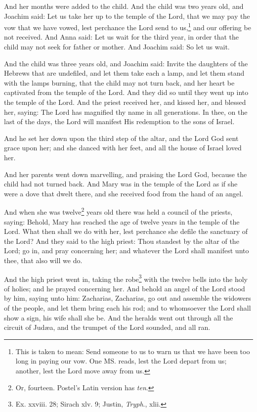 \pend\pstart
{}

\pend\setcounter{pstartR}{1}\pstart
And her months were added to the child. And the child was two years old, and Joachim said: Let us take her up to the temple of the Lord, that we may pay the vow that we have vowed, lest perchance the Lord send to us,\footnote{This is taken to mean: Send someone to us to warn us that we have been too long in paying our vow. One MS. reads, lest the Lord depart from us; another, lest the Lord move away from us.} and our offering be not received. And Anna said: Let us wait for the third year, in order that the child may not seek for father or mother. And Joachim said: So let us wait.

\pend\pstart
And the child was three years old, and Joachim said: Invite the daughters of the Hebrews that are undefiled, and let them take each a lamp, and let them stand with the lamps burning, that the child may not turn back, and her heart be captivated from the temple of the Lord. And they did so until they went up into the temple of the Lord. And the priest received her, and kissed her, and blessed her, saying: The Lord has magnified thy name in all generations. In thee, on the last of the days, the Lord will manifest His redemption to the sons of Israel.

\pend\pstart
And he set her down upon the third step of the altar, and the Lord God sent grace upon her; and she danced with her feet, and all the house of Israel loved her.

\pend\pstart
{}

\pend\setcounter{pstartR}{1}\pstart
And her parents went down marvelling, and praising the Lord God, because the child had not turned back. And Mary was in the temple of the Lord as if she were a dove that dwelt there, and she received food from the hand of an angel.

\pend\pstart
And when she was twelve\footnote{Or, fourteen. Postel's Latin version has \textit{ten}.} years old there was held a council of the priests, saying: Behold, Mary has reached the age of twelve years in the temple of the Lord. What then shall we do with her, lest perchance she defile the sanctuary of the Lord? And they said to the high priest: Thou standest by the altar of the Lord; go in, and pray concerning her; and whatever the Lord shall manifest unto thee, that also will we do.

\pend\pstart
And the high priest went in, taking the robe\footnote{Ex. xxviii. 28; Sirach xlv. 9; Justin, \textit{Tryph}., xlii.} with the twelve bells into the holy of holies; and he prayed concerning her. And behold an angel of the Lord stood by him, saying unto him: Zacharias, Zacharias, go out and assemble the widowers of the people, and let them bring each his rod; and to whomsoever the Lord shall show a sign, his wife shall she be. And the heralds went out through all the circuit of Judæa, and the trumpet of the Lord sounded, and all ran.

